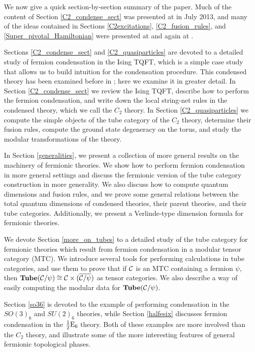 \medskip

We now give a quick section-by-section summary of the paper.
Much of the content of Section \ref{C2_condense_sect} was presented at \cite{Walker2013} in July 2013,
and many of the ideas contained in Sections \ref{C2excitations}, \ref{C2_fusion_rules}, and \ref{Super_pivotal_Hamiltonian} were presented at \cite{Walker2014} and again
at \cite{Walker2015}.

Sections \ref{C2_condense_sect} and \ref{C2_quasiparticles} are devoted to a detailed study of 
fermion condensation in the Ising TQFT, which is a simple case study that allows us to build intuition for the condensation procedure.
This condensed theory has been examined before in \cite{bhardwaj2016, kapustin2017}; 
here we examine it in greater detail. 
In Section \ref{C2_condense_sect} we review the Ising TQFT, describe how to perform the 
fermion condensation, and write down the local string-net rules in the condensed theory, 
which we call the $C_2$ theory. 
In Section \ref{C2_quasiparticles} we compute the simple objects of the tube category of the $C_2$ theory,
determine their fusion rules,
compute the ground state degeneracy on the torus, 
and study the modular transformations 
of the theory. 

In Section \ref{generalities}, we present a collection of more general results
on the machinery of fermionic theories. 
We show how to perform fermion condensation in more general settings
and discuss the fermionic version 
of the tube category construction in more generality.
We also discuss how to compute quantum dimensions and fusion rules,
and we prove some general
relations between the total quantum dimensions of condensed theories, their 
parent theories, and their tube categories.
Additionally, we present a Verlinde-type
dimension formula for fermionic theories.

We devote Section \ref{more_on_tubes} to a detailed study of the tube category 
for fermionic theories which result from fermion condensation in a modular tensor category (MTC). 
We introduce several tools for performing calculations in tube categories, 
and use them to prove that if $\mathcal{C}$ is an MTC containing a fermion $\psi$, then
$\textbf{Tube}(\mathcal{C}/\psi)\cong \mathcal{C}\times (\overline{\mathcal{C}/\psi})$ as tensor 
categories. We also describe a way of easily computing the modular data for 
$\textbf{Tube}(\mathcal{C}/\psi)$. 

Section \ref{so36} is devoted to the example of performing condensation in the $SO(3)_6$ 
and $SU(2)_6$ theories, while Section \ref{halfesix} discusses fermion condensation in the $
\frac{1}{2}\text{E}_6$ theory. 
Both of these examples are more involved than the $C_2$ theory, 
and illustrate some of the more interesting features of general fermionic topological phases. 

